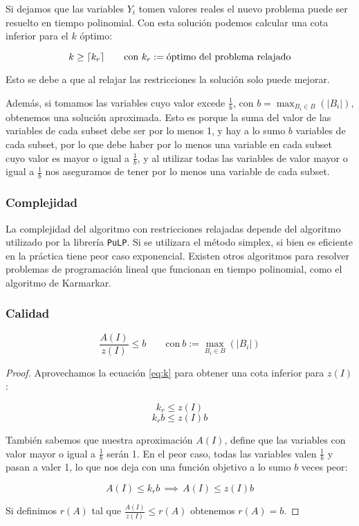 Si dejamos que las variables $Y_i$ tomen valores reales el nuevo problema puede
ser resuelto en tiempo polinomial. Con esta solución podemos calcular una cota
inferior para el $k$ óptimo:

\begin{equation}
    \label{eq:k}
    k \ge \lceil k_r\rceil \qquad \text{con} \ k_r := \text{óptimo del problema
    relajado}
\end{equation}

Esto se debe a que al relajar las restricciones la solución solo puede mejorar.

Además, si tomamos las variables cuyo valor excede $\frac{1}{b}$, con $b =
\max_{B_i \in B}(|B_i|)$, obtenemos una solución aproximada. Esto es porque la
suma del valor de las variables de cada subset debe ser por lo menos 1, y hay a
lo sumo $b$ variables de cada subset, por lo que debe haber por lo menos una
variable en cada subset cuyo valor es mayor o igual a $\frac{1}{b}$, y al
utilizar todas las variables de valor mayor o igual a $\frac{1}{b}$ nos
aseguramos de tener por lo menos una variable de cada subset.

\subsubsection{Complejidad}

La complejidad del algoritmo con restricciones relajadas depende del algoritmo
utilizado por la librería \texttt{PuLP}. Si se utilizara el método simplex, si
bien es eficiente en la práctica tiene peor caso exponencial. Existen otros
algoritmos para resolver problemas de programación lineal que funcionan en
tiempo polinomial, como el algoritmo de Karmarkar.

\subsubsection{Calidad}

\[ \frac{A(I)}{z(I)} \le b \qquad \text{con} \ b := \max_{B_i \in B}(|B_i|) \]

\begin{proof}

    Aprovechamos la ecuación \eqref{eq:k} para obtener una cota inferior para
    $z(I)$:

    \[ k_r \le z(I) \]
    \[ k_r b \le z(I) b \]

    También sabemos que nuestra aproximación $A(I)$, define que las variables
    con valor mayor o igual a $\frac{1}{b}$ serán 1. En el peor caso, todas las
    variables valen $\frac{1}{b}$ y pasan a valer 1, lo que nos deja con una
    función objetivo a lo sumo $b$ veces peor:

    \[ A(I) \le k_r b \, \implies \, A(I) \le z(I) b \]

    Si definimos $r(A)$ tal que $\frac{A(I)}{z(I)} \le r(A)$ obtenemos $r(A) =
    b$.
\end{proof}

